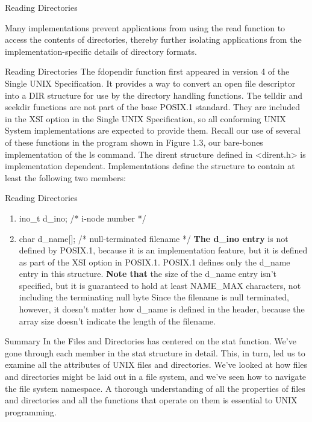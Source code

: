 \documentclass{beamer}
\begin{document}
\begin{frame}[t]{Reading Directories}

 Many implementations prevent applications
from using the read function to access the contents of directories, thereby further
isolating applications from the implementation-specific details of directory formats.
\end{frame}
\begin{frame}[t]{Reading Directories}
The fdopendir function first appeared in version 4 of the Single UNIX
Specification. It provides a way to convert an open file descriptor into a DIR structure
for use by the directory handling functions.
The telldir and seekdir functions are not part of the base POSIX.1 standard.
They are included in the XSI option in the Single UNIX Specification, so all conforming
UNIX System implementations are expected to provide them.
Recall our use of several of these functions in the program shown in Figure 1.3, our
bare-bones implementation of the ls command.
The dirent structure defined in <dirent.h> is implementation dependent.
Implementations define the structure to contain at least the following two members:

\end{frame}
\begin{frame}[t]{Reading Directories}
\begin{enumerate}
	\item ino\_t d\_ino; /* i-node number */
	\item char d\_name[]; /* null-terminated filename */
\textbf{The d\_ino entry}	 is not defined by POSIX.1, because it is an implementation feature, but it is
	defined as part of the XSI option in POSIX.1. POSIX.1 defines only the d\_name entry in this
	structure.
\textbf{	Note that} the size of the d\_name entry isn’t specified, but it is guaranteed to hold at
	least NAME\_MAX characters, not including the terminating null byte
	Since the filename is null terminated, however, it doesn’t matter how d\_name is defined
	in the header, because the array size doesn’t indicate the length of the filename.
\end{enumerate}

\end{frame}
\begin{frame}[t]{Summary}
 In the Files and Directories has centered on the stat function. We’ve gone through each member in
the stat structure in detail. This, in turn, led us to examine all the attributes of UNIX
files and directories. We’ve looked at how files and directories might be laid out in a file system, and we’ve seen how to navigate the file system namespace. A thorough
understanding of all the properties of files and directories and all the functions that
operate on them is essential to UNIX programming.

\end{frame}
\end{document}
